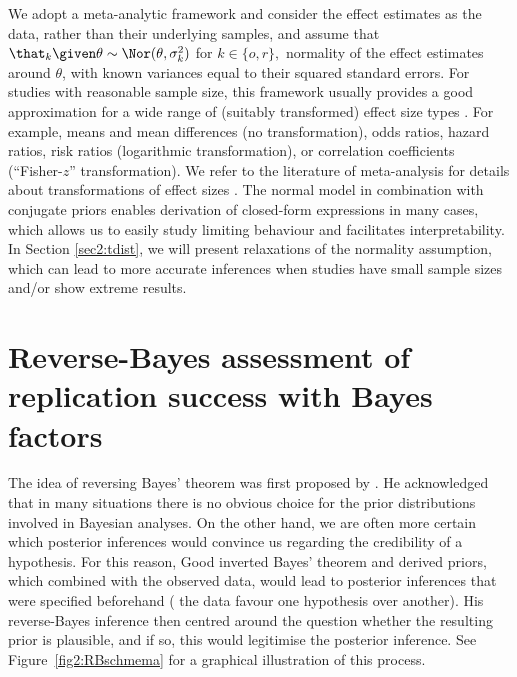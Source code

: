 We adopt a meta-analytic framework and consider the effect estimates as the
data, rather than their underlying samples, and assume that
$\that_k \given \theta \sim \Nor(\theta, \sigma^2_k)$ for $k \in \{o, r\},$ \ie{}
normality of the effect estimates around $\theta$, with known variances equal to
their squared standard errors. For studies with reasonable sample size, this
framework usually provides a good approximation for a wide range of (suitably
transformed) effect size types \citep[chapter 2.4]{Spiegelhalter2004}. For
example, means and mean differences (no transformation), odds ratios, hazard
ratios, risk ratios (logarithmic transformation), or correlation coefficients
(``Fisher-$z$'' transformation). We refer to the literature of meta-analysis for
details about transformations of effect sizes \citep[\eg{}][chapter
11.6]{Cooper2019}. The normal model in combination with conjugate priors enables
derivation of closed-form expressions in many cases, which allows us to easily
study limiting behaviour and facilitates interpretability. In Section
\ref{sec2:tdist}, we will present relaxations of the normality assumption, which
can lead to more accurate inferences when studies have small sample sizes and/or
show extreme results.


\section{Reverse-Bayes assessment of replication success with Bayes factors}
\label{sec2:methods}
The idea of reversing Bayes' theorem was first proposed by \citet{Good1950}. He
acknowledged that in many situations there is no obvious choice for the prior
distributions involved in Bayesian analyses. On the other hand, we are often
more certain which posterior inferences would convince us regarding the
credibility of a hypothesis. For this reason, Good inverted Bayes' theorem and
derived priors, which combined with the observed data, would lead to posterior
inferences that were specified beforehand (\eg{} the data favour one hypothesis
over another). His reverse-Bayes inference then centred around the question
whether the resulting prior is plausible, and if so, this would legitimise the
posterior inference. See Figure~\ref{fig2:RBschmema} for a graphical illustration
of this process.

